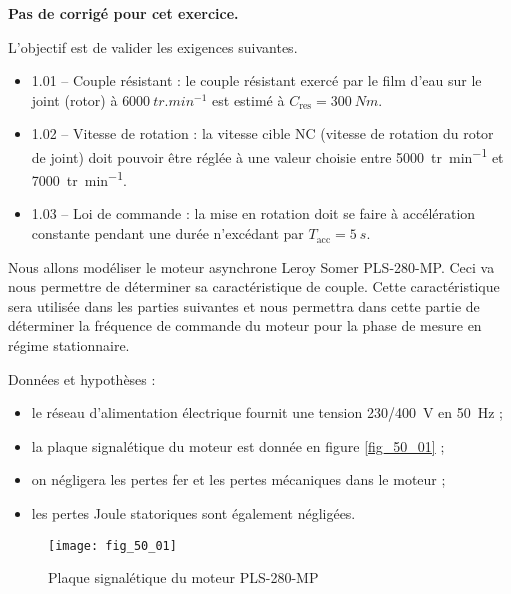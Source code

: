 \normaltrue \difficilefalse \tdifficilefalse
\correctionfalse

\setcounter{numques}{0}
\ifcorrection
\else
\textbf{Pas de corrigé pour cet exercice.}
\fi

\ifprof
\else



\begin{obj}
L'objectif est de valider les exigences suivantes.
\begin{itemize}
\item 1.01 -- Couple résistant : le couple résistant exercé par le film d’eau sur le joint (rotor) à $\SI{6000}{tr.min^{-1}}$  est estimé à $C_{\text{res}} = \SI{300}{Nm}$.
\item 1.02 -- Vitesse de rotation : la vitesse cible NC (vitesse de rotation du rotor de joint) doit
pouvoir être réglée à une valeur choisie entre \SI{5000}{tr.min^{-1}} 
et \SI{7000}{tr.min^{-1}}.
\item 1.03 -- Loi de commande : la mise en rotation doit se faire à accélération constante pendant une durée n’excédant par $T_{\text{acc}} = \SI{5}{s}$.
\end{itemize}

Nous allons modéliser le moteur asynchrone Leroy Somer
PLS-280-MP. Ceci va nous permettre de déterminer sa caractéristique de couple. Cette
caractéristique sera utilisée dans les parties suivantes et nous permettra dans cette partie
de déterminer la fréquence de commande du moteur pour la phase de mesure en régime
stationnaire.
\end{obj}


Données et hypothèses :
\begin{itemize}
\item le réseau d’alimentation électrique fournit une tension 230/\SI{400}{V} en \SI{50}{Hz} ;
\item la plaque signalétique du moteur est donnée en figure \autoref{fig_50_01} ;
\item on négligera les pertes fer et les pertes mécaniques dans le moteur ;
\item les pertes Joule statoriques sont également négligées.
\end{itemize}

\begin{figure}[H]
\centering
\texttt{[image: fig\_50\_01]}
\caption{Plaque signalétique du moteur PLS-280-MP \label{fig_50_01}}
\end{figure}
\fi

